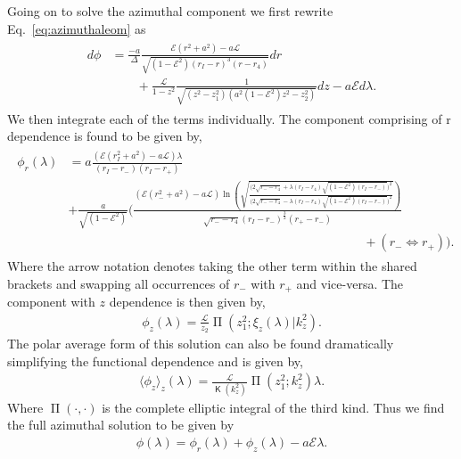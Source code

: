 \documentclass[12pt, amsmath]{revtex4-2}
\newcommand\lam{\lambda}
\newcommand\EN{\mathcal{E}}
\newcommand\ANG{\mathcal{L}}
\newcommand{\elK}{\operatorname{\mathsf{K}}}%
\newcommand{\elPi}{\operatorname{\mathsf{\Pi}}}%
\begin{document}
Going on to solve the azimuthal component we first rewrite Eq.~\eqref{eq:azimuthaleom} as
\begin{align}
\begin{aligned}
        d\phi &= \frac{-a}{\Delta}\frac{\mathcal{E}(r^2+a^2)-a\mathcal{L}}{\sqrt{(1-\EN^2)(r_I-r)^3(r-r_4)}}dr\\
        &\qquad+\frac{\mathcal{L}}{1-z^2}\frac{1}{\sqrt{(z^2-z_1^2)(a^2(1-\EN^2) z^2-z_2^2)}}dz
        -a\mathcal{E}d\lam. 
\end{aligned}
\end{align}
We then integrate each of the terms individually. The component comprising of r dependence is found to be given by,
\begin{align}
\begin{aligned}
    \phi_r(\lam)& = a \frac{(\EN(r_I^2+ a^2) - a \ANG)\lam }{(r_I-r_{-})(r_I-r_{+})} \\
    &+ \frac{a}{\sqrt{(1-\EN^2)}}\bigg(\frac{(\EN(r_{-}^2+ a^2) - a\ANG)
   \ln\left({\sqrt{\frac{\big(2\sqrt{r_{-}-r_4}+\lam(r_I-r_4)\sqrt{(1-\EN^2)(r_I-r_-)}\big)^2}{\big(2\sqrt{r_{-}-r_4}-\lam(r_I-r_4)\sqrt{(1-\EN^2)(r_I-r_-)}\big)^2}}}\right)}{\sqrt{r_{-}-r_4}(r_I-r_{-})^{\frac{3}{2}}(r_{+}-r_{-})}\\
   &\;\;\;\;\;\;\;\;\;\;\;\;\;\;\;\;\;\;\;\;\;\;\;\;\;\;\;\;\;\;\;\;\;\;\;\;\;\;\;\;\;\;\;\;\;\;\;\;\;\;\;\;\;\;\;\;\;\;\;\;\;\;\;\;\;\;\;\;\;\;\;\;\;\;\;\;\;\;\;\;\;\;\;\;\;+ (r_{-} \Longleftrightarrow r_{+}) \bigg).
\end{aligned}
\end{align}
Where the arrow notation denotes taking the other term within the shared brackets and swapping all occurrences of $r_-$ with $r_+$ and vice-versa. The component with $z$ dependence is then given by,
\begin{align}
    \phi_z(\lam) = \frac{\ANG}{z_2}  \elPi(z_1^2; \xi_z(\lam) | k_z^2 ).
\end{align}
The polar average form of this solution can also be found dramatically simplifying the functional dependence and is given by,
\begin{align}
    \langle \phi_z \rangle_z(\lam) = \frac{\ANG}{ \elK(k_z^2)}\elPi(z_1^2; k_z^2 ) \lam.
\end{align}
Where $\elPi(\cdot,\cdot)$ is the complete elliptic integral of the third kind. Thus we find the full azimuthal solution to be given by 
\begin{align}
    \phi(\lam) = \phi_r(\lam) + \phi_z(\lam) - a \EN \lam.
\end{align}
\end{document}

